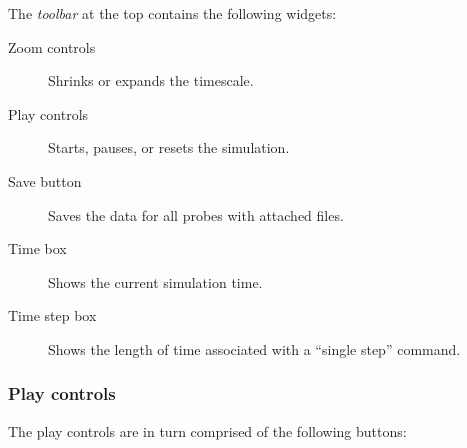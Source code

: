 \documentclass{article}
\begin{document}
The {\it toolbar} at the top contains the following widgets:

\begin{description}

\item[Zoom controls]\mbox{}

Shrinks or expands the timescale.

\item[Play controls]\mbox{}

Starts, pauses, or resets the simulation.

\item[Save button]\mbox{}

Saves the data for all probes with attached files.

\item[Time box]\mbox{}

Shows the current simulation time.

\item[Time step box]\mbox{}

Shows the length of time associated with a ``single step'' command.

\end{description}

\subsubsection{Play controls}
\label{TimelinePlayControls}

The play controls are in turn comprised of the following buttons:
\end{document}
